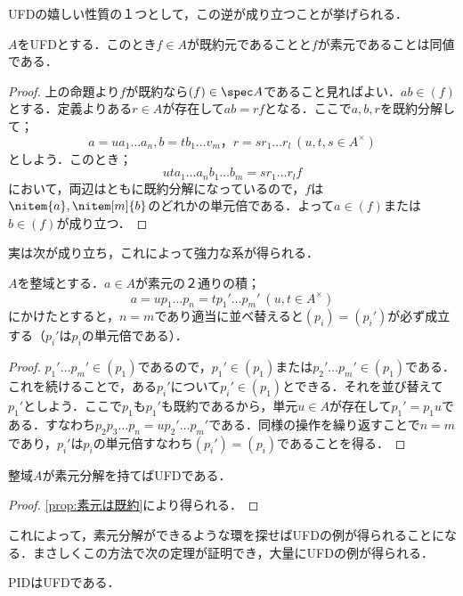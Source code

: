UFDの嬉しい性質の１つとして，この逆が成り立つことが挙げられる．
\begin{prop}\label{prop:UFDでは既約と素元が同値}
	$A$をUFDとする．このとき$f\in A$が既約元であることと$f$が素元であることは同値である．
\end{prop}
\begin{proof}
	上の命題より$f$が既約なら$(f)\in\spec A$であること見ればよい．$ab\in(f)$とする．定義よりある$r\in A$が存在して$ab=rf$となる．ここで$a,b,r$を既約分解して；
		\[a=ua_1\dots a_n,b=tb_1\dots v_m，r=sr_1\dots r_l~(u,t,s\in A^\times)\]
		としよう．このとき；
		\[uta_1\dots a_nb_1\dots b_m=sr_1\dots r_lf\]
		において，両辺はともに既約分解になっているので，$f$は$\nitem{a},\nitem[m]{b}$のどれかの単元倍である．よって$a\in(f)$または$b\in(f)$が成り立つ．
\end{proof}

実は次が成り立ち，これによって強力な系が得られる．
\begin{prop}
	$A$を整域とする．$a\in A$が素元の２通りの積；
	\[a=up_1\dots p_n=tp_1'\dots p_m'~(u,t\in A^\times)\]
	にかけたとすると，$n=m$であり適当に並べ替えると$(p_i)=(p_i')$が必ず成立する（$p_i'$は$p_i$の単元倍である）．
\end{prop}

\begin{proof}
	$p_1'\dots p_m'\in (p_1)$であるので，$p_1'\in (p_1)$または$p_2'\dots p_m'\in (p_1)$である．これを続けることで，ある$p_i'$について$p_i'\in (p_1)$とできる．それを並び替えて$p_1'$としよう．ここで$p_1$も$p_1'$も既約であるから，単元$u\in A$が存在して$p_1'=p_1u$である．すなわち$p_2p_3\dots p_n=up_2'\dots p_m'$である．同様の操作を繰り返すことで$n=m$であり，$p_i'$は$p_i$の単元倍すなわち$(p_i')=(p_i)$であることを得る．
\end{proof}

\begin{cor}
	整域$A$が素元分解を持てばUFDである．
\end{cor}

\begin{proof}
	\ref{prop:素元は既約}により得られる．
\end{proof}

これによって，素元分解ができるような環を探せばUFDの例が得られることになる．まさしくこの方法で次の定理が証明でき，大量にUFDの例が得られる．
\begin{thm}
	PIDはUFDである．
\end{thm}

